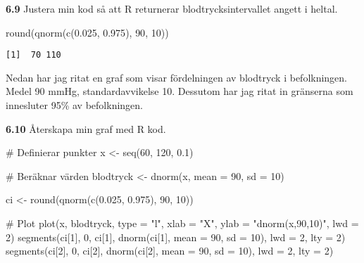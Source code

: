 \documentclass[
  letterpaper,
  DIV=11,
  numbers=noendperiod]{scrartcl}
\newenvironment{Shaded}{\begin{snugshade}}{\end{snugshade}}
\newcommand{\AttributeTok}[1]{\textcolor[rgb]{0.40,0.45,0.13}{#1}}
\newcommand{\CommentTok}[1]{\textcolor[rgb]{0.37,0.37,0.37}{#1}}
\newcommand{\DecValTok}[1]{\textcolor[rgb]{0.68,0.00,0.00}{#1}}
\newcommand{\FloatTok}[1]{\textcolor[rgb]{0.68,0.00,0.00}{#1}}
\newcommand{\FunctionTok}[1]{\textcolor[rgb]{0.28,0.35,0.67}{#1}}
\newcommand{\NormalTok}[1]{\textcolor[rgb]{0.00,0.23,0.31}{#1}}
\newcommand{\OtherTok}[1]{\textcolor[rgb]{0.00,0.23,0.31}{#1}}
\newcommand{\StringTok}[1]{\textcolor[rgb]{0.13,0.47,0.30}{#1}}
\begin{document}
\textbf{6.9} Justera min kod så att R returnerar blodtrycksintervallet
angett i heltal.

\begin{Shaded}
\begin{Highlighting}[]
\FunctionTok{round}\NormalTok{(}\FunctionTok{qnorm}\NormalTok{(}\FunctionTok{c}\NormalTok{(}\FloatTok{0.025}\NormalTok{, }\FloatTok{0.975}\NormalTok{), }\DecValTok{90}\NormalTok{, }\DecValTok{10}\NormalTok{))}
\end{Highlighting}
\end{Shaded}

\begin{verbatim}
[1]  70 110
\end{verbatim}

Nedan har jag ritat en graf som visar fördelningen av blodtryck i
befolkningen. Medel 90 mmHg, standardavvikelse 10. Dessutom har jag
ritat in gränserna som innesluter 95\% av befolkningen.

\textbf{6.10} Återskapa min graf med R kod.

\begin{Shaded}
\begin{Highlighting}[]
\CommentTok{\# Definierar punkter}
\NormalTok{x }\OtherTok{\textless{}{-}} \FunctionTok{seq}\NormalTok{(}\DecValTok{60}\NormalTok{, }\DecValTok{120}\NormalTok{, }\FloatTok{0.1}\NormalTok{)}

\CommentTok{\# Beräknar värden}
\NormalTok{blodtryck }\OtherTok{\textless{}{-}} \FunctionTok{dnorm}\NormalTok{(x, }\AttributeTok{mean =} \DecValTok{90}\NormalTok{, }\AttributeTok{sd =} \DecValTok{10}\NormalTok{)}

\NormalTok{ci }\OtherTok{\textless{}{-}} \FunctionTok{round}\NormalTok{(}\FunctionTok{qnorm}\NormalTok{(}\FunctionTok{c}\NormalTok{(}\FloatTok{0.025}\NormalTok{, }\FloatTok{0.975}\NormalTok{), }\DecValTok{90}\NormalTok{, }\DecValTok{10}\NormalTok{))}

\CommentTok{\# Plot}
\FunctionTok{plot}\NormalTok{(x, blodtryck, }\AttributeTok{type =} \StringTok{"l"}\NormalTok{, }\AttributeTok{xlab =} \StringTok{"X"}\NormalTok{, }\AttributeTok{ylab =} \StringTok{"dnorm(x,90,10)"}\NormalTok{, }\AttributeTok{lwd =} \DecValTok{2}\NormalTok{)}
\FunctionTok{segments}\NormalTok{(ci[}\DecValTok{1}\NormalTok{], }\DecValTok{0}\NormalTok{, ci[}\DecValTok{1}\NormalTok{], }\FunctionTok{dnorm}\NormalTok{(ci[}\DecValTok{1}\NormalTok{], }\AttributeTok{mean =} \DecValTok{90}\NormalTok{, }\AttributeTok{sd =} \DecValTok{10}\NormalTok{), }\AttributeTok{lwd =} \DecValTok{2}\NormalTok{, }\AttributeTok{lty =} \DecValTok{2}\NormalTok{)}
\FunctionTok{segments}\NormalTok{(ci[}\DecValTok{2}\NormalTok{], }\DecValTok{0}\NormalTok{, ci[}\DecValTok{2}\NormalTok{], }\FunctionTok{dnorm}\NormalTok{(ci[}\DecValTok{2}\NormalTok{], }\AttributeTok{mean =} \DecValTok{90}\NormalTok{, }\AttributeTok{sd =} \DecValTok{10}\NormalTok{), }\AttributeTok{lwd =} \DecValTok{2}\NormalTok{, }\AttributeTok{lty =} \DecValTok{2}\NormalTok{)}
\end{Highlighting}
\end{Shaded}
\end{document}
